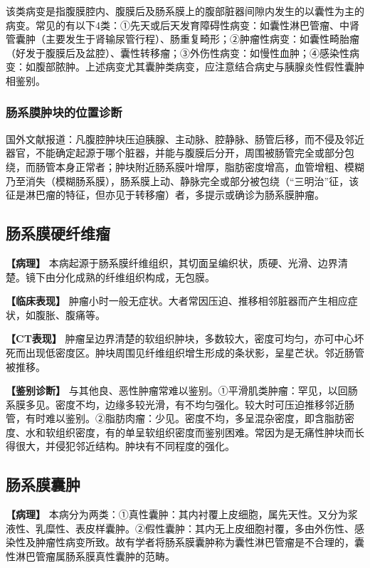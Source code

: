 该类病变是指腹膜腔内、腹膜后及肠系膜上的腹部脏器间隙内发生的以囊性为主的病变。常见的有以下4类：①先天或后天发育障碍性病变：如囊性淋巴管瘤、中肾管囊肿（主要发生于肾输尿管行程）、肠重复畸形；②肿瘤性病变：如囊性畸胎瘤（好发于腹膜后及盆腔）、囊性转移瘤；③外伤性病变：如慢性血肿；④感染性病变：如腹部脓肿。上述病变尤其囊肿类病变，应注意结合病史与胰腺炎性假性囊肿相鉴别。

\subsubsection{肠系膜肿块的位置诊断}

国外文献报道：凡腹腔肿块压迫胰腺、主动脉、腔静脉、肠管后移，而不侵及邻近器官，不能确定起源于哪个脏器，并能与腹膜后分开，周围被肠管完全或部分包绕，而肠管本身正常者；肿块附近肠系膜叶增厚，脂肪密度增高，血管增粗、模糊乃至消失（模糊肠系膜），肠系膜上动、静脉完全或部分被包绕（“三明治”征，该征是淋巴瘤的特征，但亦见于转移瘤）者，多提示或确诊为肠系膜肿瘤。

\subsection{肠系膜硬纤维瘤}

\textbf{【病理】}
本病起源于肠系膜纤维组织，其切面呈编织状，质硬、光滑、边界清楚。镜下由分化成熟的纤维组织构成，无包膜。

\textbf{【临床表现】}
肿瘤小时一般无症状。大者常因压迫、推移相邻脏器而产生相应症状，如腹胀、腹痛等。

\textbf{【CT表现】}
肿瘤呈边界清楚的软组织肿块，多数较大，密度可均匀，亦可中心坏死而出现低密度区。肿块周围见纤维组织增生形成的条状影，呈星芒状。邻近肠管被推移。

\textbf{【鉴别诊断】}
与其他良、恶性肿瘤常难以鉴别。①平滑肌类肿瘤：罕见，以回肠系膜多见。密度不均，边缘多较光滑，有不均匀强化。较大时可压迫推移邻近肠管，有时难以鉴别。②脂肪肉瘤：少见。密度不均，多呈混杂密度，即含脂肪密度、水和软组织密度，有的单呈软组织密度而鉴别困难。常因为是无痛性肿块而长得很大，并侵犯邻近结构。肿块有不同程度的强化。

\subsection{肠系膜囊肿}

\textbf{【病理】}
本病分为两类：①真性囊肿：其内衬覆上皮细胞，属先天性。又分为浆液性、乳糜性、表皮样囊肿。②假性囊肿：其内无上皮细胞衬覆，多由外伤性、感染性及肿瘤性病变所致。故有学者将肠系膜囊肿称为囊性淋巴管瘤是不合理的，囊性淋巴管瘤属肠系膜真性囊肿的范畴。

